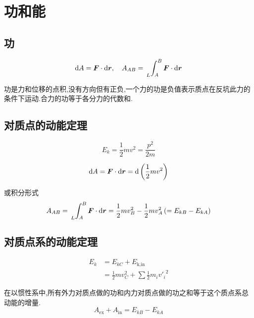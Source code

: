 \chapter{功和能}
\thispagestyle{empty}
\section{功}
\begin{equation}
{\rm{d}} A=\bm{F} \cdot {\rm{d}} \bm{r},\quad A_{AB}=\sideset{_L}{}{\int_{A}^{B}}\bm{F}\cdot {\rm{d}} \bm{r}
\end{equation}
\par 功是力和位移的点积,没有方向但有正负,一个力的功是负值表示质点在反坑此力的条件下运动.合力的功等于各分力的代数和.


\section{对质点的动能定理}
\begin{equation}
E_k=\frac{1}{2}mv^2=\frac{p^2}{2m}
\end{equation}
\par {}
\begin{equation}
{\rm{d}} A = \bm{F}\cdot {\rm{d}} \bm{r}={\rm{d}} \left(\frac{1}{2} m v^2 \right) 
\end{equation}
\par 或积分形式
\begin{equation}
A_{AB}=\sideset{_L}{}{\int_{A}^{B}}\bm{F}\cdot {\rm{d}} \bm{r}=\frac{1}{2}mv_B^2-\frac{1}{2}mv_A^2\,(=E_{kB}-E_{kA})
\end{equation}

\section{对质点系的动能定理}
\begin{equation}
\begin{split}
E_{k}&=E_{kC}+E_{\text{k,in}}\\
&=\frac{1}{2}mv_C^2+\sum\frac{1}{2}m_i{v'_i}^{2}
\end{split}
\end{equation}
\par {}\jg
\par 在以惯性系中,所有外力对质点做的功和内力对质点做的功之和等于这个质点系总动能的增量.
\begin{equation}
A_{\text{ex}}+A_{\text{in}}=E_{kB}-E_{kA}
\end{equation}

